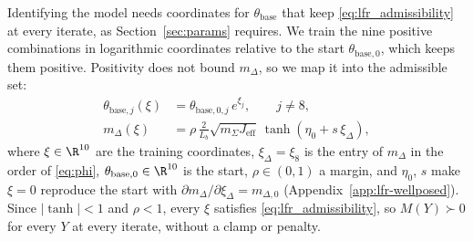 Identifying the model needs coordinates for $\theta_{\mathrm{base}}$ that keep
\eqref{eq:lfr_admissibility} at every iterate, as Section~\ref{sec:params}
requires.
We train the nine positive combinations in logarithmic coordinates relative to
the start $\theta_{\mathrm{base},0}$, which keeps them positive.
Positivity does not bound $m_\Delta$, so we map it into the admissible set:
\begin{equation}
\begin{aligned}
 \theta_{\mathrm{base},j}(\xi)&=\theta_{\mathrm{base},0,j}\,e^{\xi_j},\qquad j\neq8,\\
 m_\Delta(\xi)&=\rho\,\frac{2}{L_b}\sqrt{m_\Sigma J_{\mathrm{eff}}}\,\tanh(\eta_0+s\,\xi_\Delta),
\end{aligned}
\label{eq:mdelta_map}
\end{equation}
where $\xi\in\R^{10}$ are the training coordinates, $\xi_\Delta=\xi_8$ is the
entry of $m_\Delta$ in the order of \eqref{eq:phi},
$\theta_{\mathrm{base},0}\in\R^{10}$ is the start, $\rho\in(0,1)$ a margin, and
$\eta_0$, $s$ make $\xi=0$ reproduce the start with
$\partial m_\Delta/\partial\xi_\Delta=m_{\Delta,0}$
(Appendix~\ref{app:lfr-wellposed}).
Since $|\tanh|<1$ and $\rho<1$, every $\xi$ satisfies
\eqref{eq:lfr_admissibility}, so $M(Y)\succ0$ for every $Y$ at every iterate,
without a clamp or penalty.

